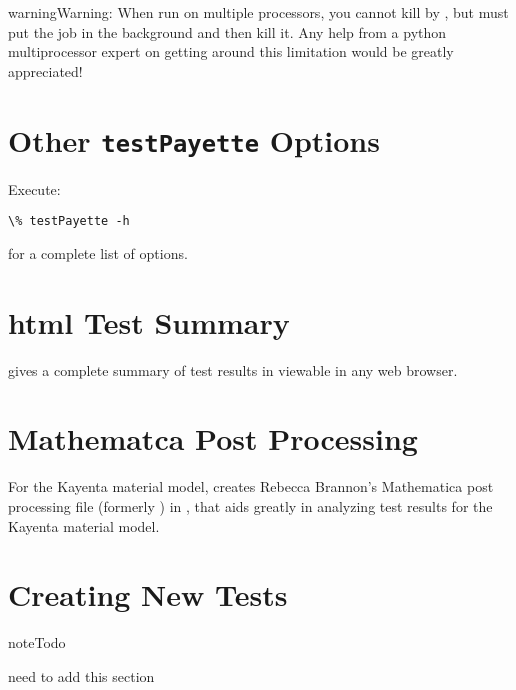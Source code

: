 \documentclass[letterpaper,10pt,english]{sphinxmanual}
\begin{document}
\begin{notice}{warning}{Warning:}
When run on multiple processors, you cannot kill  by
, but must put the job in the background and then kill it. Any help
from a python multiprocessor expert on getting around this limitation would be
greatly appreciated!
\end{notice}


\section{Other \texttt{testPayette} Options}
\label{Files/test_payette:other-testpayette-options}
Execute:

\begin{Verbatim}[commandchars=\\\{\}]
\% testPayette -h
\end{Verbatim}

for a complete list of options.


\section{html Test Summary}
\label{Files/test_payette:html-test-summary}
 gives a complete summary of test results in
 viewable in any web browser.


\section{Mathematca Post Processing}
\label{Files/test_payette:mathematca-post-processing}
For the Kayenta material model,  creates Rebecca Brannon's
Mathematica post processing file  (formerly )
in , that aids greatly in
analyzing test results for the Kayenta material model.


\section{Creating New Tests}
\label{Files/test_payette:creating-new-tests}
\begin{notice}{note}{Todo}

need to add this section
\end{notice}
\end{document}
